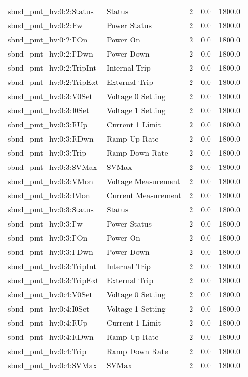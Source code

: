 \begin{center}
\begin{longtable}{l | l l l l }
sbnd\_pmt\_hv:0:2:Status & Status & 2 & 0.0 & 1800.0\\ 
sbnd\_pmt\_hv:0:2:Pw & Power Status & 2 & 0.0 & 1800.0\\ 
sbnd\_pmt\_hv:0:2:POn & Power On & 2 & 0.0 & 1800.0\\ 
sbnd\_pmt\_hv:0:2:PDwn & Power Down & 2 & 0.0 & 1800.0\\ 
sbnd\_pmt\_hv:0:2:TripInt & Internal Trip & 2 & 0.0 & 1800.0\\ 
sbnd\_pmt\_hv:0:2:TripExt & External Trip & 2 & 0.0 & 1800.0\\ 
sbnd\_pmt\_hv:0:3:V0Set & Voltage 0 Setting & 2 & 0.0 & 1800.0\\ 
sbnd\_pmt\_hv:0:3:I0Set & Voltage 1 Setting & 2 & 0.0 & 1800.0\\ 
sbnd\_pmt\_hv:0:3:RUp & Current 1 Limit & 2 & 0.0 & 1800.0\\ 
sbnd\_pmt\_hv:0:3:RDwn & Ramp Up Rate & 2 & 0.0 & 1800.0\\ 
sbnd\_pmt\_hv:0:3:Trip & Ramp Down Rate & 2 & 0.0 & 1800.0\\ 
sbnd\_pmt\_hv:0:3:SVMax & SVMax & 2 & 0.0 & 1800.0\\ 
sbnd\_pmt\_hv:0:3:VMon & Voltage Measurement & 2 & 0.0 & 1800.0\\ 
sbnd\_pmt\_hv:0:3:IMon & Current Measurement & 2 & 0.0 & 1800.0\\ 
sbnd\_pmt\_hv:0:3:Status & Status & 2 & 0.0 & 1800.0\\ 
sbnd\_pmt\_hv:0:3:Pw & Power Status & 2 & 0.0 & 1800.0\\ 
sbnd\_pmt\_hv:0:3:POn & Power On & 2 & 0.0 & 1800.0\\ 
sbnd\_pmt\_hv:0:3:PDwn & Power Down & 2 & 0.0 & 1800.0\\ 
sbnd\_pmt\_hv:0:3:TripInt & Internal Trip & 2 & 0.0 & 1800.0\\ 
sbnd\_pmt\_hv:0:3:TripExt & External Trip & 2 & 0.0 & 1800.0\\ 
sbnd\_pmt\_hv:0:4:V0Set & Voltage 0 Setting & 2 & 0.0 & 1800.0\\ 
sbnd\_pmt\_hv:0:4:I0Set & Voltage 1 Setting & 2 & 0.0 & 1800.0\\ 
sbnd\_pmt\_hv:0:4:RUp & Current 1 Limit & 2 & 0.0 & 1800.0\\ 
sbnd\_pmt\_hv:0:4:RDwn & Ramp Up Rate & 2 & 0.0 & 1800.0\\ 
sbnd\_pmt\_hv:0:4:Trip & Ramp Down Rate & 2 & 0.0 & 1800.0\\ 
sbnd\_pmt\_hv:0:4:SVMax & SVMax & 2 & 0.0 & 1800.0\\ 

\end{longtable}
\end{center}
